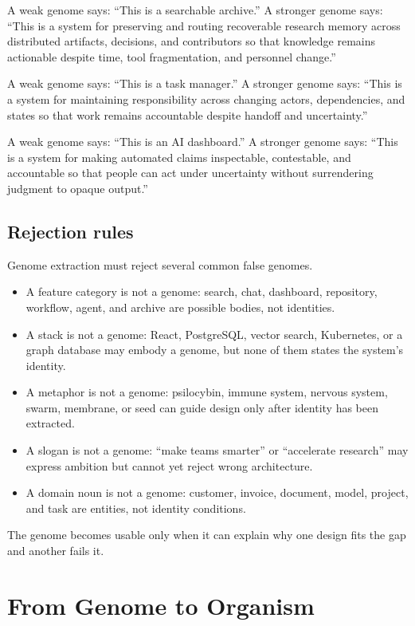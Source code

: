 \documentclass[11pt]{article}
\begin{document}
A weak genome says: ``This is a searchable archive.'' A stronger genome says: ``This is a system for preserving and routing recoverable research memory across distributed artifacts, decisions, and contributors so that knowledge remains actionable despite time, tool fragmentation, and personnel change.''

A weak genome says: ``This is a task manager.'' A stronger genome says: ``This is a system for maintaining responsibility across changing actors, dependencies, and states so that work remains accountable despite handoff and uncertainty.''

A weak genome says: ``This is an AI dashboard.'' A stronger genome says: ``This is a system for making automated claims inspectable, contestable, and accountable so that people can act under uncertainty without surrendering judgment to opaque output.''

\subsection{Rejection rules}

Genome extraction must reject several common false genomes.

\begin{itemize}[leftmargin=*]
    \item A feature category is not a genome: search, chat, dashboard, repository, workflow, agent, and archive are possible bodies, not identities.
    \item A stack is not a genome: React, PostgreSQL, vector search, Kubernetes, or a graph database may embody a genome, but none of them states the system's identity.
    \item A metaphor is not a genome: psilocybin, immune system, nervous system, swarm, membrane, or seed can guide design only after identity has been extracted.
    \item A slogan is not a genome: ``make teams smarter'' or ``accelerate research'' may express ambition but cannot yet reject wrong architecture.
    \item A domain noun is not a genome: customer, invoice, document, model, project, and task are entities, not identity conditions.
\end{itemize}

The genome becomes usable only when it can explain why one design fits the gap and another fails it.

\section{From Genome to Organism}
\end{document}
